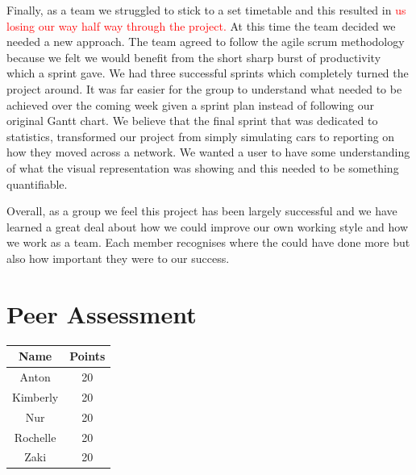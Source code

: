 \documentclass{article}
\begin{document}
	 Finally, as a team we struggled to stick to a set timetable and this resulted in \textcolor{red}{us losing our way half way through the project.} At this time the team decided we needed a new approach. The team agreed to follow the agile scrum methodology because we felt we would benefit from the short sharp burst of productivity which a sprint gave. We had three successful sprints which completely turned the project around. It was far easier for the group to understand what needed to be achieved over the coming week given a sprint plan instead of following our original Gantt chart. We believe that the final sprint that was dedicated to statistics, transformed our project from simply simulating cars to reporting on how they moved across a network. We wanted a user to have some understanding of what the visual representation was showing and this needed to be something quantifiable. 
	 
	 Overall, as a group we feel this project has been largely successful and we have learned a great deal about how we could improve our own working style and how we work as a team. Each member recognises where the could have done more but also how important they were to our success. 
	
	
	
	
	\section{Peer Assessment}
	\begin{tabular}{|c|c|}
		\hline {\bf Name} & {\bf Points} \\ 
		\hline Anton & 20 \\ 
		\hline Kimberly & 20 \\ 
		\hline Nur & 20 \\ 
		\hline Rochelle & 20 \\ 
		\hline  Zaki & 20 \\ 
		\hline 
	\end{tabular} 
	
	
	
	
	
\end{document}
